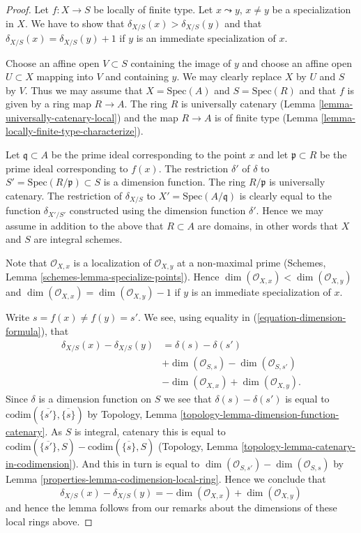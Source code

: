 \begin{proof}
Let $f : X \to S$ be locally of finite type.
Let $x \leadsto y$, $x \not = y$ be a specialization in $X$.
We have to show that $\delta_{X/S}(x) > \delta_{X/S}(y)$ and
that $\delta_{X/S}(x) = \delta_{X/S}(y) + 1$ if $y$ is an
immediate specialization of $x$.

\medskip\noindent
Choose an affine open $V \subset S$ containing the image of
$y$ and choose an affine open $U \subset X$ mapping into $V$
and containing $y$. We may clearly replace $X$ by $U$ and
$S$ by $V$. Thus we may assume that $X = \text{Spec}(A)$
and $S = \text{Spec}(R)$ and that $f$ is given by a ring
map $R \to A$. The ring $R$ is universally catenary
(Lemma \ref{lemma-universally-catenary-local})
and the map $R \to A$ is of finite type
(Lemma \ref{lemma-locally-finite-type-characterize}).

\medskip\noindent
Let $\mathfrak q \subset A$ be the prime ideal corresponding
to the point $x$ and let $\mathfrak p \subset R$ be the prime
ideal corresponding to $f(x)$. The restriction $\delta'$ of $\delta$
to $S' = \text{Spec}(R/\mathfrak p) \subset S$ is a dimension
function. The ring $R/\mathfrak p$ is universally catenary.
The restriction of $\delta_{X/S}$ to $X' = \text{Spec}(A/\mathfrak q)$
is clearly equal to the function $\delta_{X'/S'}$ constructed
using the dimension function $\delta'$. Hence we may assume
in addition to the above that $R \subset A$ are domains, in
other words that $X$ and $S$ are integral schemes.

\medskip\noindent
Note that $\mathcal{O}_{X, x}$ is a localization of
$\mathcal{O}_{X, y}$ at a non-maximal prime
(Schemes, Lemma \ref{schemes-lemma-specialize-points}).
Hence $\dim(\mathcal{O}_{X, x}) < \dim(\mathcal{O}_{X, y})$
and $\dim(\mathcal{O}_{X, x}) = \dim(\mathcal{O}_{X, y}) - 1$
if $y$ is an immediate specialization of $x$.

\medskip\noindent
Write $s = f(x) \not = f(y) = s'$. We see, using equality
in (\ref{equation-dimension-formula}), that
\begin{align*}
\delta_{X/S}(x) - \delta_{X/S}(y) & = \delta(s) - \delta(s') \\
& + \dim(\mathcal{O}_{S, s}) - \dim(\mathcal{O}_{S, s'}) \\
& - \dim(\mathcal{O}_{X, x}) + \dim(\mathcal{O}_{X, y}).
\end{align*}
Since $\delta$ is a dimension function on $S$ we see that
$\delta(s) - \delta(s')$ is equal to
$\text{codim}(\overline{\{s'\}}, \overline{\{s\}})$ by
Topology, Lemma \ref{topology-lemma-dimension-function-catenary}.
As $S$ is integral, catenary this is equal to
$\text{codim}(\overline{\{s'\}}, S) - \text{codim}(\overline{\{s\}}, S)$
(Topology, Lemma \ref{topology-lemma-catenary-in-codimension}).
And this in turn is equal to
$\dim(\mathcal{O}_{S, s'}) - \dim(\mathcal{O}_{S, s})$ by
Lemma \ref{properties-lemma-codimension-local-ring}.
Hence we conclude that
$$
\delta_{X/S}(x) - \delta_{X/S}(y)
=
- \dim(\mathcal{O}_{X, x}) + \dim(\mathcal{O}_{X, y})
$$
and hence the lemma follows from our remarks about the dimensions
of these local rings above.
\end{proof}

